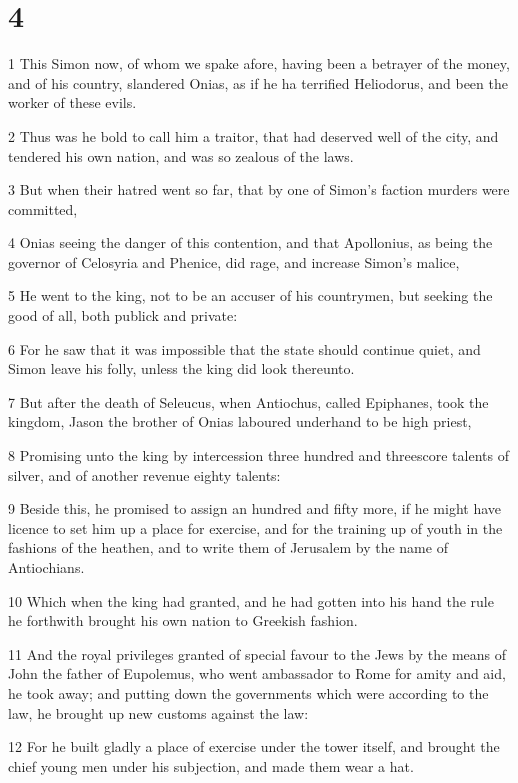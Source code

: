 \chapter{4}

\par 1 This Simon now, of whom we spake afore, having been a betrayer of the money, and of his country, slandered Onias, as if he ha terrified Heliodorus, and been the worker of these evils.
\par 2 Thus was he bold to call him a traitor, that had deserved well of the city, and tendered his own nation, and was so zealous of the laws.
\par 3 But when their hatred went so far, that by one of Simon's faction murders were committed,
\par 4 Onias seeing the danger of this contention, and that Apollonius, as being the governor of Celosyria and Phenice, did rage, and increase Simon's malice,
\par 5 He went to the king, not to be an accuser of his countrymen, but seeking the good of all, both publick and private:
\par 6 For he saw that it was impossible that the state should continue quiet, and Simon leave his folly, unless the king did look thereunto.
\par 7 But after the death of Seleucus, when Antiochus, called Epiphanes, took the kingdom, Jason the brother of Onias laboured underhand to be high priest,
\par 8 Promising unto the king by intercession three hundred and threescore talents of silver, and of another revenue eighty talents:
\par 9 Beside this, he promised to assign an hundred and fifty more, if he might have licence to set him up a place for exercise, and for the training up of youth in the fashions of the heathen, and to write them of Jerusalem by the name of Antiochians.
\par 10 Which when the king had granted, and he had gotten into his hand the rule he forthwith brought his own nation to Greekish fashion.
\par 11 And the royal privileges granted of special favour to the Jews by the means of John the father of Eupolemus, who went ambassador to Rome for amity and aid, he took away; and putting down the governments which were according to the law, he brought up new customs against the law:
\par 12 For he built gladly a place of exercise under the tower itself, and brought the chief young men under his subjection, and made them wear a hat.
